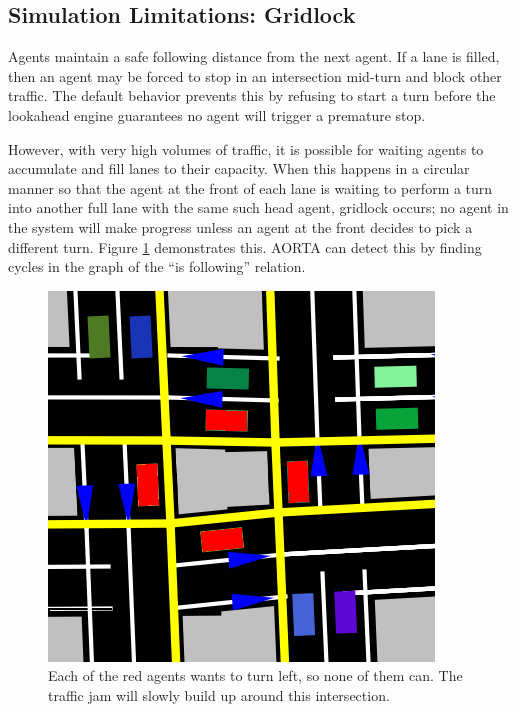 \documentclass[letterpaper, 10 pt, conference]{ieeeconf}  %
\begin{document}

\subsection{Simulation Limitations: Gridlock}

Agents maintain a safe following distance from the next agent. If a lane is
filled, then an agent may be forced to stop in an intersection mid-turn and
block other traffic. The default behavior prevents this by refusing to start a
turn before the lookahead engine guarantees no agent will trigger a premature
stop.

However, with very high volumes of traffic, it is possible for waiting agents to
accumulate and fill lanes to their capacity. When this happens in a circular
manner so that the agent at the front of each lane is waiting to perform a turn
into another full lane with the same such head agent, gridlock \cite{gridlock}
occurs; no agent in the system will make progress unless an agent at the front
decides to pick a different turn. Figure \ref{fig:gridlock} demonstrates this.
AORTA can detect this by finding cycles in the graph of the ``is following''
relation.

\begin{figure}[h]
  \centering \includegraphics[scale=0.25]{gridlock.png}
  \caption{Each of the red agents wants to turn left, so none of them
           can. The traffic jam will slowly build up around this intersection.}
  \label{fig:gridlock}
  \vspace{-10pt}
\end{figure}
\end{document}
